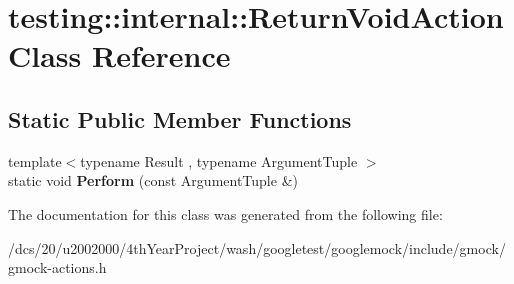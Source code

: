 \hypertarget{classtesting_1_1internal_1_1ReturnVoidAction}{}\section{testing\+:\+:internal\+:\+:Return\+Void\+Action Class Reference}
\label{classtesting_1_1internal_1_1ReturnVoidAction}
\subsection*{Static Public Member Functions}
\begin{DoxyCompactItemize}
\item 
\mbox{\label{classtesting_1_1internal_1_1ReturnVoidAction_ab9ea50ff501225b7510a623d0f0a405e}} 
{\footnotesize template$<$typename Result , typename Argument\+Tuple $>$ }\\static void {\bfseries Perform} (const Argument\+Tuple \&)
\end{DoxyCompactItemize}


The documentation for this class was generated from the following file\+:\begin{DoxyCompactItemize}
\item 
/dcs/20/u2002000/4th\+Year\+Project/wash/googletest/googlemock/include/gmock/gmock-\/actions.\+h\end{DoxyCompactItemize}
